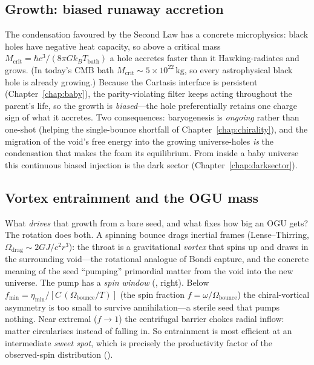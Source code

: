\subsection{Growth: biased runaway accretion}

The condensation favoured by the Second Law has a concrete microphysics: black
holes have negative heat capacity, so above a critical mass
$M_{\mathrm{crit}} = \hbar c^3/(8\pi G k_B T_{\mathrm{bath}})$ a hole accretes
faster than it Hawking-radiates and grows. (In today's CMB bath
$M_{\mathrm{crit}}\sim 5\times10^{22}\,\mathrm{kg}$, so every astrophysical black
hole is already growing.) Because the Cartasis interface is persistent
(Chapter~\ref{chap:baby}), the parity-violating filter keeps acting throughout
the parent's life, so the growth is \emph{biased}---the hole preferentially
retains one charge sign of what it accretes. Two consequences: baryogenesis is
\emph{ongoing} rather than one-shot (helping the single-bounce shortfall of
Chapter~\ref{chap:chirality}), and the migration of the void's free energy into
the growing universe-holes \emph{is} the condensation that makes the foam its
equilibrium. From inside a baby universe this continuous biased injection is the
dark sector (Chapter~\ref{chap:darksector}).

\subsection{Vortex entrainment and the OGU mass}
\label{sec:vortex-genesis}

What \emph{drives} that growth from a bare seed, and what fixes how big an OGU
gets? The rotation does both. A spinning bounce drags inertial frames
(Lense--Thirring, $\Omega_{\mathrm{drag}}\sim 2GJ/c^2r^3$): the throat is a
gravitational \emph{vortex} that spins up and draws in the surrounding void---the
rotational analogue of Bondi capture, and the concrete meaning of the seed
``pumping'' primordial matter from the void into the new universe. The pump has a
\emph{spin window} (, right). Below
$f_{\min}=\eta_{\min}/[C\,(\Omega_{\mathrm{bounce}}/T)]$ (the spin fraction
$f=\omega/\Omega_{\mathrm{bounce}}$) the chiral-vortical asymmetry is too small to
survive annihilation---a sterile seed that pumps nothing. Near extremal ($f\to1$)
the centrifugal barrier chokes radial inflow: matter circularises instead of
falling in. So entrainment is most efficient at an intermediate \emph{sweet spot},
which is precisely the productivity factor of the observed-spin distribution
().

